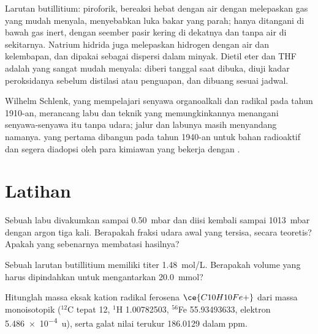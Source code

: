 \begin{safety}{}
Larutan butillitium: piroforik, bereaksi hebat dengan air dengan melepaskan
gas yang mudah menyala, menyebabkan luka bakar yang parah; hanya ditangani di bawah gas inert, dengan seember pasir
kering di dekatnya dan tanpa air di sekitarnya. Natrium hidrida juga melepaskan
hidrogen dengan air dan kelembapan, dan dipakai sebagai dispersi dalam minyak. Dietil
eter dan THF adalah  yang sangat mudah menyala: diberi tanggal saat dibuka, diuji kadar
peroksidanya sebelum distilasi atau penguapan, dan dibuang sesuai jadwal.
\end{safety}

\begin{history}
Wilhelm Schlenk, yang mempelajari senyawa organoalkali dan radikal pada tahun 1910-an,
merancang labu dan teknik yang memungkinkannya menangani senyawa-senyawa itu tanpa udara; jalur
dan labunya masih menyandang namanya.  yang pertama dibangun pada tahun
1940-an untuk bahan radioaktif dan segera diadopsi oleh para kimiawan yang bekerja dengan
.
\end{history}

\section{Latihan}

\begin{exercise}[$\star$]\label{exo:b3:lab-techniques-3:1}
Sebuah labu divakumkan sampai \qty{0.50}{mbar} dan diisi kembali sampai \qty{1013}{mbar} dengan argon tiga kali. Berapakah fraksi
udara awal yang tersisa, secara teoretis? Apakah yang sebenarnya membatasi hasilnya?
\end{exercise}

\begin{exercise}[$\star$]\label{exo:b3:lab-techniques-3:2}
Sebuah larutan butillitium memiliki titer \qty{1.48}{mol/L}. Berapakah volume yang harus dipindahkan untuk mengantarkan
\qty{20.0}{mmol}?
\end{exercise}

\begin{exercise}[$\star$]\label{exo:b3:lab-techniques-3:3}
Hitunglah massa eksak kation radikal ferosena $\ce{C10H10Fe+}$ dari massa monoisotopik
($^{12}$C tepat 12, $^1$H 1.00782503, $^{56}$Fe 55.93493633, elektron \qty{5.486e-4}{u}), serta galat nilai terukur
186.0129 dalam ppm.
\end{exercise}

